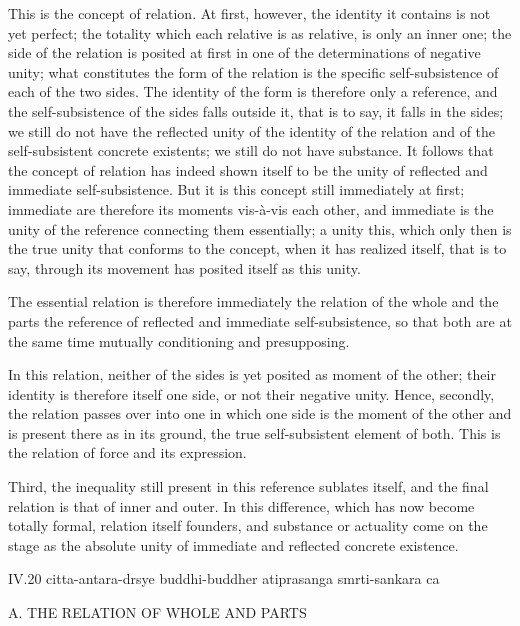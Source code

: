 This is the concept of relation.
At first, however, the identity it contains
is not yet perfect;
the totality which each relative is as relative,
is only an inner one;
the side of the relation is posited at first
in one of the determinations of negative unity;
what constitutes the form of the relation is
the specific self-subsistence of each of the two sides.
The identity of the form is therefore only a reference,
and the self-subsistence of the sides falls outside it,
that is to say, it falls in the sides;
we still do not have the reflected unity
of the identity of the relation
and of the self-subsistent concrete existents;
we still do not have substance.
It follows that the concept of relation has
indeed shown itself to be the unity
of reflected and immediate self-subsistence.
But it is this concept still immediately at first;
immediate are therefore its moments vis-à-vis each other,
and immediate is the unity of the reference
connecting them essentially;
a unity this, which only then is the true unity
that conforms to the concept,
when it has realized itself, that is to say,
through its movement has posited itself as this unity.

The essential relation is therefore immediately
the relation of the whole and the parts
the reference of reflected and immediate self-subsistence,
so that both are at the same time
mutually conditioning and presupposing.

In this relation, neither of the sides is
yet posited as moment of the other;
their identity is therefore itself one side,
or not their negative unity.
Hence, secondly, the relation passes over into one
in which one side is the moment of the other
and is present there as in its ground,
the true self-subsistent element of both.
This is the relation of force and its expression.

Third, the inequality still present
in this reference sublates itself,
and the final relation is that of inner and outer.
In this difference,
which has now become totally formal,
relation itself founders,
and substance or actuality come on the stage
as the absolute unity of
immediate and reflected concrete existence.

IV.20
citta-antara-drsye buddhi-buddher atiprasanga smrti-sankara ca

A. THE RELATION OF WHOLE AND PARTS

